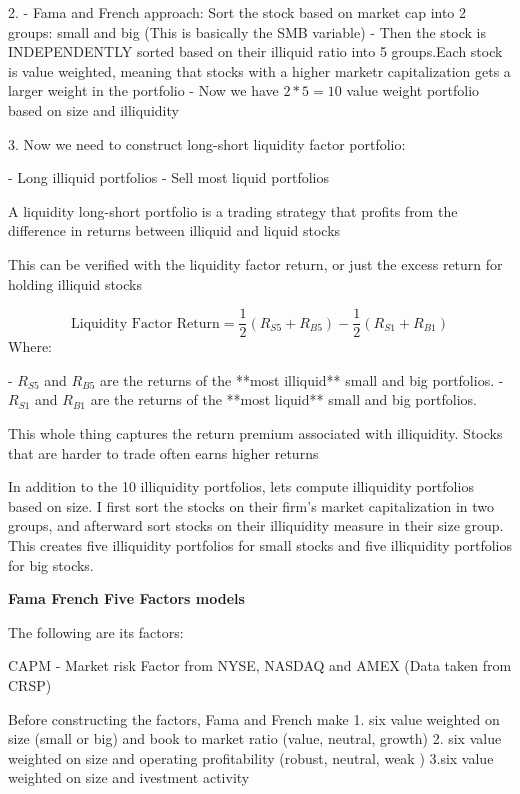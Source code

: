 2.
- Fama and French approach: Sort the stock based on market cap into 2 groups: small and big (This is basically the SMB variable)
- Then the stock is INDEPENDENTLY sorted based on their illiquid ratio into 5 groups.Each stock is value weighted, meaning that stocks with a higher marketr capitalization gets a larger weight in the portfolio
- Now we have $2*5=10$ value weight portfolio based on size and illiquidity


3.
Now we need to construct long-short liquidity factor portfolio:

- Long illiquid portfolios
- Sell most liquid portfolios

A liquidity long-short portfolio is a trading strategy that profits from the difference in returns between illiquid and liquid stocks

This can be verified with the liquidity factor return, or just the excess return for holding illiquid stocks

$$
\text{Liquidity Factor Return} = \frac{1}{2} \left( R_{S5} + R_{B5} \right) - \frac{1}{2} \left( R_{S1} + R_{B1} \right)
$$
Where:

- \( R_{S5} \) and \( R_{B5} \) are the returns of the **most illiquid** small and big portfolios.
- \( R_{S1} \) and \( R_{B1} \) are the returns of the **most liquid** small and big portfolios.



This whole thing captures the return premium associated with illiquidity. Stocks that are harder to trade often earns higher returns


In addition to the 10 illiquidity portfolios, lets compute illiquidity portfolios based on size. I first sort the stocks on their firm’s market capitalization in two groups, and afterward sort stocks on their illiquidity measure in their size group. This creates five illiquidity portfolios for small stocks and five illiquidity portfolios for big stocks.



\textbf{Fama French Five Factors models}

The following are its factors:

CAPM
- Market risk Factor from NYSE, NASDAQ and AMEX (Data taken from CRSP)

Before constructing the factors, Fama and French make 
1. six value weighted on size (small or big) and book to market ratio (value, neutral, growth)
2. six value weighted on size and operating profitability (robust, neutral, weak )
3.six value weighted on size and ivestment activity

